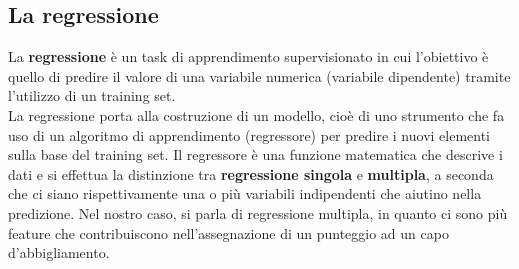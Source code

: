 \documentclass[a4paper, 11pt, oneside]{report}
\begin{document}
                \subsection{La regressione}
                La \textbf{regressione} è un task di apprendimento supervisionato in cui l'obiettivo è quello di predire il valore
                di una variabile numerica (variabile dipendente) tramite l'utilizzo di un training set.
                \\La regressione
                porta alla costruzione di un modello, cioè di uno strumento che fa uso di un algoritmo di apprendimento
                (regressore) per predire i nuovi elementi sulla base del training set. Il regressore è una funzione matematica
                che descrive i dati e si effettua la distinzione tra \textbf{regressione singola} e \textbf{multipla}, a seconda che ci siano
                rispettivamente una o più variabili indipendenti che aiutino nella predizione. Nel nostro caso, si parla di
                regressione multipla, in quanto ci sono più feature che contribuiscono nell'assegnazione di un punteggio ad
                un capo d'abbigliamento.
\end{document}
